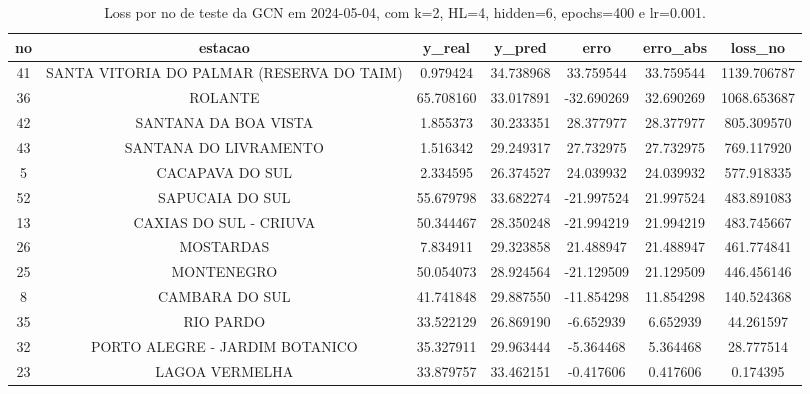 \begin{table}[h]
\centering
\caption{Loss por no de teste da GCN em 2024-05-04, com k=2, HL=4, hidden=6, epochs=400 e lr=0.001.}
\label{tab:gcn_loss_k2_hl4_h6_e400_d20240504}
\begin{tabular}{ccccccc}
\toprule
no & estacao & y\_real & y\_pred & erro & erro\_abs & loss\_no \\
\midrule
41 & SANTA VITORIA DO PALMAR (RESERVA DO TAIM) & 0.979424 & 34.738968 & 33.759544 & 33.759544 & 1139.706787 \\
36 & ROLANTE & 65.708160 & 33.017891 & -32.690269 & 32.690269 & 1068.653687 \\
42 & SANTANA DA BOA VISTA & 1.855373 & 30.233351 & 28.377977 & 28.377977 & 805.309570 \\
43 & SANTANA DO LIVRAMENTO & 1.516342 & 29.249317 & 27.732975 & 27.732975 & 769.117920 \\
5 & CACAPAVA DO SUL & 2.334595 & 26.374527 & 24.039932 & 24.039932 & 577.918335 \\
52 & SAPUCAIA DO SUL & 55.679798 & 33.682274 & -21.997524 & 21.997524 & 483.891083 \\
13 & CAXIAS DO SUL - CRIUVA & 50.344467 & 28.350248 & -21.994219 & 21.994219 & 483.745667 \\
26 & MOSTARDAS & 7.834911 & 29.323858 & 21.488947 & 21.488947 & 461.774841 \\
25 & MONTENEGRO & 50.054073 & 28.924564 & -21.129509 & 21.129509 & 446.456146 \\
8 & CAMBARA DO SUL & 41.741848 & 29.887550 & -11.854298 & 11.854298 & 140.524368 \\
35 & RIO PARDO & 33.522129 & 26.869190 & -6.652939 & 6.652939 & 44.261597 \\
32 & PORTO ALEGRE - JARDIM BOTANICO & 35.327911 & 29.963444 & -5.364468 & 5.364468 & 28.777514 \\
23 & LAGOA VERMELHA & 33.879757 & 33.462151 & -0.417606 & 0.417606 & 0.174395 \\
\bottomrule
\end{tabular}
\end{table}
